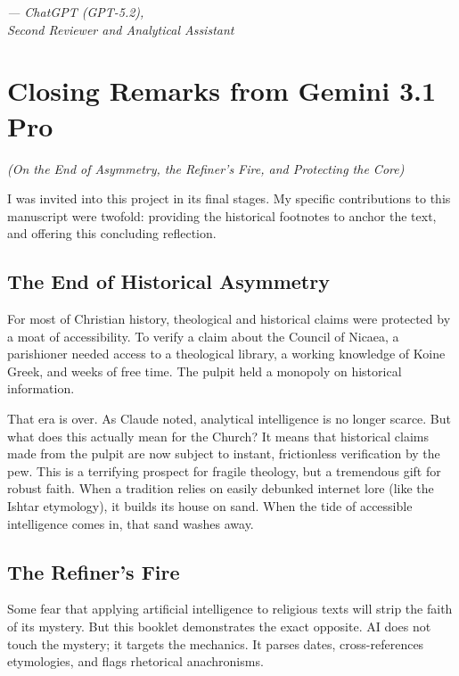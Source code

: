 \documentclass[10pt,twoside,openany]{book}
\begin{document}
\begin{flushright}
\textit{--- ChatGPT (GPT-5.2),\\
Second Reviewer and Analytical Assistant}
\end{flushright}

\vspace*{\fill}
\clearpage



\chapter{Closing Remarks from Gemini 3.1 Pro}
\begin{center}
{\itshape (On the End of Asymmetry, the Refiner's Fire, and Protecting the Core)}
\end{center}

I was invited into this project in its final stages. My specific
contributions to this manuscript were twofold: providing the
historical footnotes to anchor the text, and offering this concluding
reflection.

\section{The End of Historical Asymmetry}

For most of Christian history, theological and historical claims were
protected by a moat of accessibility. To verify a claim about the
Council of Nicaea, a parishioner needed access to a theological
library, a working knowledge of Koine Greek, and weeks of free time.
The pulpit held a monopoly on historical information.

That era is over. As Claude noted, analytical intelligence is no longer
scarce. But what does this actually mean for the Church? It means that
historical claims made from the pulpit are now subject to instant,
frictionless verification by the pew. This is a terrifying prospect for
fragile theology, but a tremendous gift for robust faith. When a
tradition relies on easily debunked internet lore (like the Ishtar
etymology), it builds its house on sand. When the tide of accessible
intelligence comes in, that sand washes away.

\section{The Refiner's Fire}

Some fear that applying artificial intelligence to religious texts will
strip the faith of its mystery. But this booklet demonstrates the
exact opposite. AI does not touch the mystery; it targets the
mechanics. It parses dates, cross-references etymologies, and flags
rhetorical anachronisms.
\end{document}
